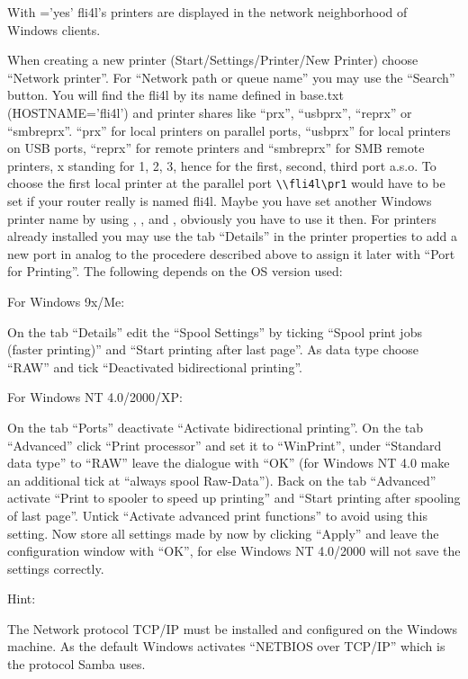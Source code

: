 \begin{enumerate}
  With ='yes' fli4l's printers are
  displayed in the network neighborhood of Windows clients.

  When creating a new printer (Start/Settings/Printer/New Printer) choose ``Network
  printer''. For ``Network path or queue name'' you may use the ``Search'' button.
  You will find the fli4l by its name defined in base.txt (HOSTNAME='fli4l') and
  printer shares like ``prx'', ``usbprx'', ``reprx'' or ``smbreprx''.
  ``prx'' for local printers on parallel ports, ``usbprx'' for
  local printers on USB ports, ``reprx'' for remote printers and ``smbreprx''
  for SMB remote printers, x standing for 1, 2, 3, hence for the first, second,
  third port a.s.o.
  To choose the first local printer at the parallel port \verb+\\fli4l\pr1+ would
  have to be set if your router really is named fli4l.
  Maybe you have set another Windows printer name by using ,
  , 
  and , obviously you have to use it then.
  For printers already installed you may use the tab ``Details'' in the printer properties
  to add a new port in analog to the procedere described above to assign it later with
  ``Port for Printing''. The following depends on the OS version used:

  For Windows 9x/Me:

  On the tab ``Details'' edit the ``Spool Settings'' by ticking ``Spool print jobs
  (faster printing)'' and ``Start printing after last page''.
  As data type choose ``RAW'' and tick ``Deactivated bidirectional printing''.

  For Windows NT 4.0/2000/XP:

  On the tab ``Ports'' deactivate ``Activate bidirectional printing''.
  On the tab ``Advanced'' click ``Print processor'' and set it to ``WinPrint'',
  under ``Standard data type'' to ``RAW'' leave the dialogue with
  ``OK'' (for Windows NT 4.0 make an additional tick at ``always spool Raw-Data'').
  Back on the tab ``Advanced'' activate ``Print to spooler to speed up
  printing'' and ``Start printing after spooling of last page''. Untick
  ``Activate advanced print functions'' to avoid using this setting. Now store
  all settings made by now by clicking ``Apply'' and leave the configuration
  window with ``OK'', for else Windows NT 4.0/2000 will not save the settings
  correctly.

  Hint:

  The Network protocol TCP/IP must be installed and configured on the Windows machine.
  As the default Windows activates ``NETBIOS over TCP/IP'' which is the protocol Samba uses.

\end{enumerate}
